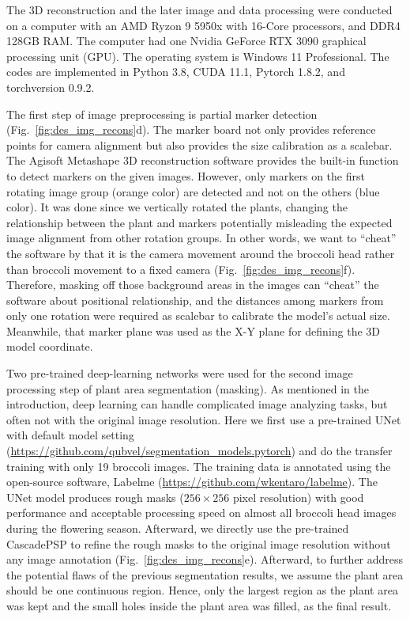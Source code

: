 The 3D reconstruction and the later image and data processing were conducted on a computer with an AMD Ryzon 9 5950x with 16-Core processors, and DDR4 128GB RAM. The computer had one Nvidia GeForce RTX 3090 graphical processing unit (GPU). The operating system is Windows 11 Professional. The codes are implemented in Python 3.8, CUDA 11.1, Pytorch 1.8.2, and torchversion 0.9.2.

The first step of image preprocessing is partial marker detection (Fig.~\ref{fig:des_img_recons}d). The marker board not only provides reference points for camera alignment but also provides the size calibration as a scalebar. The Agisoft Metashape 3D reconstruction software provides the built-in function to detect markers on the given images. However, only markers on the first rotating image group (orange color) are detected and not on the others (blue color). It was done since we vertically rotated the plants, changing the relationship between the plant and markers potentially misleading the expected image alignment from other rotation groups. In other words, we want to ``cheat'' the software by that it is the camera movement around the broccoli head rather than broccoli movement to a fixed camera (Fig.~\ref{fig:des_img_recons}f). Therefore, masking off those background areas in the images can ``cheat'' the software about positional relationship, and the distances among markers from only one rotation were required as scalebar to calibrate the model's actual size. Meanwhile, that marker plane was used as the X-Y plane for defining the 3D model coordinate.

Two pre-trained deep-learning networks were used for the second image processing step of plant area segmentation (masking). As mentioned in the introduction, deep learning can handle complicated image analyzing tasks, but often not with the original image resolution. Here we first use a pre-trained UNet with default model setting (\url{https://github.com/qubvel/segmentation_models.pytorch}) and do the transfer training with only 19 broccoli images. The training data is annotated using the open-source software, Labelme (\url{https://github.com/wkentaro/labelme}). The UNet model produces rough masks ($256 \times 256$ pixel resolution) with good performance and acceptable processing speed on almost all broccoli head images during the flowering season. Afterward, we directly use the pre-trained CascadePSP \citep[\url{https://github.com/hkchengrex/CascadePSP}]{cheng_cascadepsp_2020} to refine the rough masks to the original image resolution without any image annotation (Fig.~\ref{fig:des_img_recons}e). Afterward, to further address the potential flaws of the previous segmentation results, we assume the plant area should be one continuous region. Hence, only the largest region as the plant area was kept and the small holes inside the plant area was filled, as the final result.

